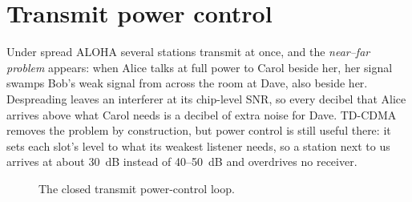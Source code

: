 \documentclass[11pt,a4paper,oneside]{report}
\newcommand{\EsNo}{\ensuremath{E_s/N_0}}
\begin{document}
\section{Transmit power control}\label{sec:power}
Under spread ALOHA several stations transmit at once, and the \emph{near--far problem} appears: when
Alice talks at full power to Carol beside her, her signal swamps Bob's weak signal from across the
room at Dave, also beside her. Despreading leaves an interferer at its chip-level SNR, so every
decibel that Alice arrives above what Carol needs is a decibel of extra noise for Dave. TD-CDMA
removes the problem by construction, but power control is still useful there: it sets each slot's
level to what its weakest listener needs, so a station next to us arrives at about \SI{30}{dB}
instead of 40--\SI{50}{dB} and overdrives no receiver.

\begin{figure}[htbp]
\centering
{}
\caption{The closed transmit power-control loop.}\label{fig:pcloop}
\end{figure}
\end{document}
